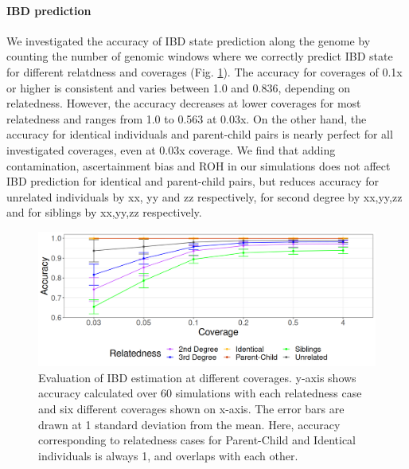 \documentclass[12pt, letterpaper]{article}
\begin{document}
\paragraph{IBD prediction}
We investigated the accuracy of IBD state prediction along the genome by counting the number of genomic windows where we correctly predict IBD state for different relatdness and coverages (Fig. \ref{fig4:IBDstate_accuracy}). The accuracy for coverages of 0.1x or higher is consistent and varies between 1.0 and 0.836, depending on relatedness. However, the accuracy decreases at lower coverages for most relatedness and ranges from 1.0 to 0.563 at 0.03x. On the other hand, the accuracy for identical individuals and parent-child pairs is nearly perfect for all investigated coverages, even at 0.03x coverage. We find that adding contamination, ascertainment bias and ROH in our simulations does not affect IBD prediction for identical and parent-child pairs, but reduces accuracy for unrelated individuals by xx, yy and zz respectively, for second degree by xx,yy,zz and for siblings by xx,yy,zz respectively. 


\begin{figure}[h!]
    \includegraphics[width=16cm]{plots/plotimg/plot_IBDaccuracy.png}
    \centering
    \caption{Evaluation of IBD estimation at different coverages. y-axis shows accuracy calculated over 60 simulations with each relatedness case and six different coverages shown on x-axis. The error bars are drawn at 1 standard deviation from the mean. Here, accuracy corresponding to relatedness cases for Parent-Child and Identical individuals is always 1, and overlaps with each other.}
    \label{fig4:IBDstate_accuracy}
\end{figure}
\end{document}
